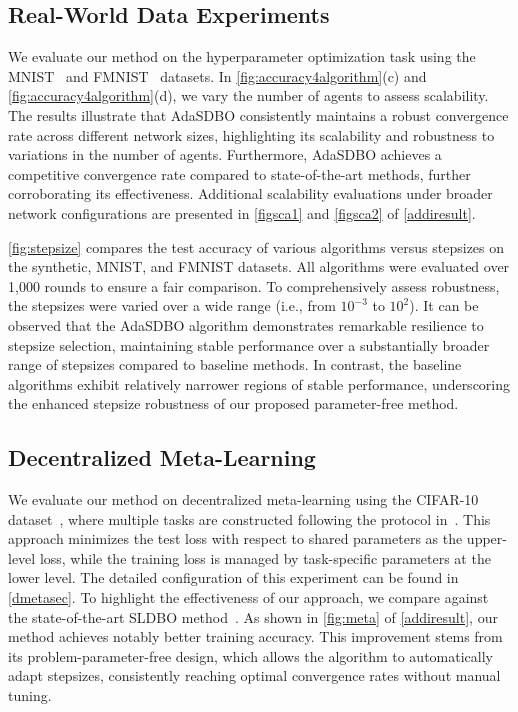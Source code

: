 \documentclass{article}
\theoremstyle{plain}
\theoremstyle{definition}
\theoremstyle{remark}
\begin{document}
\vspace{-0.2cm}
\subsection{Real-World Data Experiments}
\vspace{-0.1cm}

We evaluate our method on the hyperparameter optimization task using the MNIST~\citep{lecun1998gradient} and FMNIST~\citep{xiao2017fashion} datasets. In \cref{fig:accuracy4algorithm}(c) and \cref{fig:accuracy4algorithm}(d), we vary the number of agents to assess scalability. The results illustrate that AdaSDBO consistently maintains a robust convergence rate across different network sizes, highlighting its scalability and robustness to variations in the number of agents. Furthermore, AdaSDBO achieves a competitive convergence rate compared to state-of-the-art methods, further corroborating its effectiveness. Additional scalability evaluations under broader network configurations are presented in \cref{figsca1} and \cref{figsca2} of \cref{addiresult}.

\cref{fig:stepsize} compares the test accuracy of various algorithms versus stepsizes on the synthetic, MNIST, and FMNIST datasets. All algorithms were evaluated over 1,000  rounds to ensure a fair comparison. To comprehensively assess robustness, the stepsizes were varied over a wide range ({i.e.,} from \(10^{-3}\) to \(10^2\)). It can be observed that the AdaSDBO algorithm demonstrates remarkable resilience to stepsize selection, maintaining stable performance over a substantially broader range of stepsizes compared to baseline methods. In contrast, the baseline algorithms exhibit relatively narrower regions of stable performance, underscoring the enhanced stepsize robustness of our proposed parameter-free method.

\vspace{-0.2cm}
\subsection{Decentralized Meta-Learning}
\vspace{-0.1cm}
We evaluate our method on decentralized meta-learning using the CIFAR-10 dataset~\citep{mcmahan2017communication}, where multiple tasks are constructed following the protocol in~\citep{finn2017model}. This approach minimizes the test loss with respect to shared parameters as the upper-level loss, while the training loss is managed by task-specific parameters at the lower level. The detailed configuration of this experiment can be found in \cref{dmetasec}. To highlight the effectiveness of our approach, we compare against the state-of-the-art SLDBO method~\citep{dong2023single}. As shown in \cref{fig:meta} of \cref{addiresult}, our method achieves notably better training accuracy. This improvement stems from its problem-parameter-free design, which allows the algorithm to automatically adapt stepsizes, consistently reaching optimal convergence rates without manual tuning.
\end{document}
